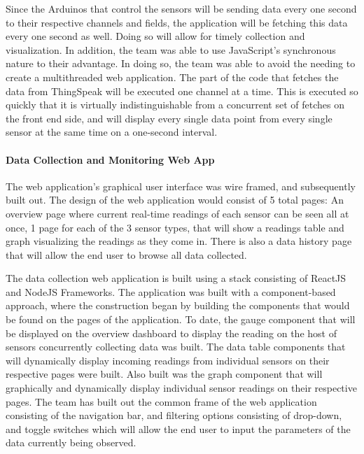 Since the Arduinos that control the sensors will be sending data every one second to their respective channels and fields, the application will be fetching this data every one second as well. Doing so will allow for timely collection and visualization. In addition, the team was able to use JavaScript's synchronous nature to their advantage. In doing so, the team was able to avoid the needing to create a multithreaded web application. The part of the code that fetches the data from ThingSpeak will be executed one channel at a time. This is executed so quickly that it is virtually indistinguishable from a concurrent set of fetches on the front end side, and will display every single data point from every single sensor at the same time on a one-second interval. 

\paragraph{Data Collection and Monitoring Web App}


The web application's graphical user interface was wire framed, and subsequently built out. The design of the web application would consist of 5 total pages: An overview page where current real-time readings of each sensor can be seen all at once, 1 page for each of the 3 sensor types, that will show a readings table and graph visualizing the readings as they come in. There is also a data history page that will allow the end user to browse all data collected.

The data collection web application is built using a stack consisting of ReactJS and NodeJS Frameworks. The application was built with a component-based approach, where the construction began by building the components that would be found on the pages of the application. To date, the gauge component that will be displayed on the overview dashboard to display the reading on the host of sensors concurrently collecting data was built. The data table components that will dynamically display incoming readings from individual sensors on their respective pages were built. Also built was the graph component that will graphically and dynamically display individual sensor readings on their respective pages. The team has built out the common frame of the web application consisting of the navigation bar, and filtering options consisting of drop-down, and toggle switches which will allow the end user to input the parameters of the data currently being observed. 

